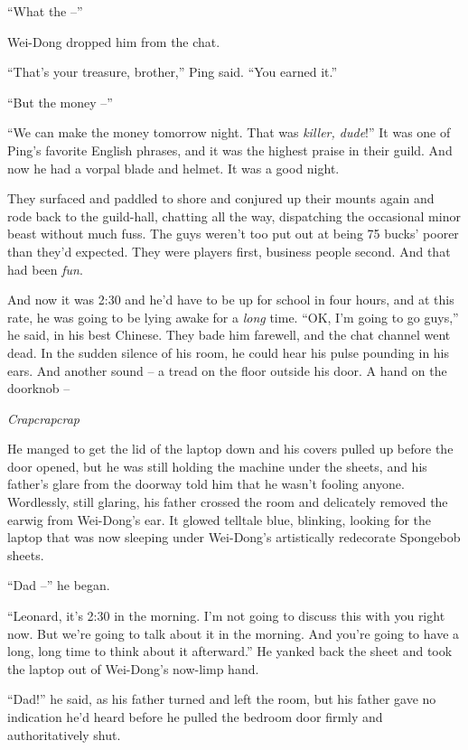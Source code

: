 ``What the --''

Wei-Dong dropped him from the chat.

``That's your treasure, brother,'' Ping said. ``You earned it.''

``But the money --''

``We can make the money tomorrow night. That was
\emph{killer, dude}!'' It was one of Ping's favorite English
phrases, and it was the highest praise in their guild. And now he
had a vorpal blade and helmet. It was a good night.

They surfaced and paddled to shore and conjured up their mounts
again and rode back to the guild-hall, chatting all the way,
dispatching the occasional minor beast without much fuss. The guys
weren't too put out at being 75 bucks' poorer than they'd expected.
They were players first, business people second. And that had been
\emph{fun}.

And now it was 2:30 and he'd have to be up for school in four
hours, and at this rate, he was going to be lying awake for a
\emph{long} time. ``OK, I'm going to go guys,'' he said, in his best
Chinese. They bade him farewell, and the chat channel went dead. In
the sudden silence of his room, he could hear his pulse pounding in
his ears. And another sound -- a tread on the floor outside his
door. A hand on the doorknob --

\emph{Crapcrapcrap}

He manged to get the lid of the laptop down and his covers pulled
up before the door opened, but he was still holding the machine
under the sheets, and his father's glare from the doorway told him
that he wasn't fooling anyone. Wordlessly, still glaring, his
father crossed the room and delicately removed the earwig from
Wei-Dong's ear. It glowed telltale blue, blinking, looking for the
laptop that was now sleeping under Wei-Dong's artistically
redecorate Spongebob sheets.

``Dad --'' he began.

``Leonard, it's 2:30 in the morning. I'm not going to discuss this
with you right now. But we're going to talk about it in the
morning. And you're going to have a long, long time to think about
it afterward.'' He yanked back the sheet and took the laptop out of
Wei-Dong's now-limp hand.

``Dad!'' he said, as his father turned and left the room, but his
father gave no indication he'd heard before he pulled the bedroom
door firmly and authoritatively shut.

\tb

